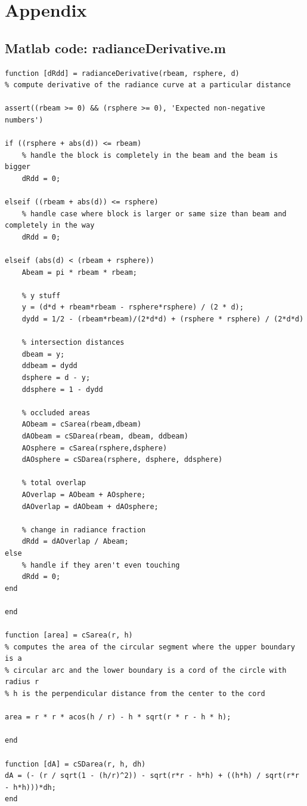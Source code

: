 \documentclass{article}
\theoremstyle{plain}
\theoremstyle{definition}
\theoremstyle{remark}
\begin{document}
\pagebreak
\appendix
\section*{Appendix}
\subsection*{Matlab code: radianceDerivative.m}
\begin{verbatim}
function [dRdd] = radianceDerivative(rbeam, rsphere, d)
% compute derivative of the radiance curve at a particular distance

assert((rbeam >= 0) && (rsphere >= 0), 'Expected non-negative numbers')

if ((rsphere + abs(d)) <= rbeam)
    % handle the block is completely in the beam and the beam is bigger
    dRdd = 0;
    
elseif ((rbeam + abs(d)) <= rsphere)
    % handle case where block is larger or same size than beam and completely in the way
    dRdd = 0;
    
elseif (abs(d) < (rbeam + rsphere))
    Abeam = pi * rbeam * rbeam;
    
    % y stuff
    y = (d*d + rbeam*rbeam - rsphere*rsphere) / (2 * d);
    dydd = 1/2 - (rbeam*rbeam)/(2*d*d) + (rsphere * rsphere) / (2*d*d)
    
    % intersection distances
    dbeam = y;
    ddbeam = dydd
    dsphere = d - y;
    ddsphere = 1 - dydd
    
    % occluded areas
    AObeam = cSarea(rbeam,dbeam)
    dAObeam = cSDarea(rbeam, dbeam, ddbeam)
    AOsphere = cSarea(rsphere,dsphere)
    dAOsphere = cSDarea(rsphere, dsphere, ddsphere)
    
    % total overlap
    AOverlap = AObeam + AOsphere;
    dAOverlap = dAObeam + dAOsphere;
    
    % change in radiance fraction
    dRdd = dAOverlap / Abeam;
else
    % handle if they aren't even touching
    dRdd = 0;
end

end

function [area] = cSarea(r, h) 
% computes the area of the circular segment where the upper boundary is a
% circular arc and the lower boundary is a cord of the circle with radius r
% h is the perpendicular distance from the center to the cord

area = r * r * acos(h / r) - h * sqrt(r * r - h * h);

end

function [dA] = cSDarea(r, h, dh)
dA = (- (r / sqrt(1 - (h/r)^2)) - sqrt(r*r - h*h) + ((h*h) / sqrt(r*r - h*h)))*dh;
end
\end{verbatim}
\end{document}
